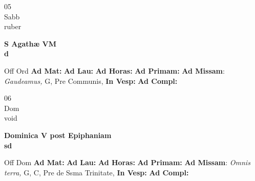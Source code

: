 \documentclass[10pt, openany]{book}
\begin{document}
    \begin{center}
        \begin{minipage}{3.5in}
            \vspace{2em}
            \begin{minipage}{0.5in}
                {\Huge 05} \\
                {\normalsize Sabb} \\
                {\normalsize ruber}
            \end{minipage}
            \begin{minipage}{3.0in}
                \textbf{ \large S Agathæ VM \\
                \textnormal{\normalsize d}} \\ 
            \end{minipage}
            \begin{justify}Off Ord
                \textbf{Ad Mat: }
                \textbf{Ad Lau: }
                \textbf{Ad Horas: }
                \textbf{Ad Primam: }\textbf{Ad Missam}: \textit{Gaudeamus,} G, Pre Communis,  
                \textbf{In Vesp: }
                \textbf{Ad Compl: }
            \end{justify}
        \end{minipage}
    \end{center}

    \begin{center}
        \begin{minipage}{3.5in}
            \vspace{2em}
            \begin{minipage}{0.5in}
                {\Huge 06} \\
                {\normalsize Dom} \\
                {\normalsize void}
            \end{minipage}
            \begin{minipage}{3.0in}
                \textbf{ \large Dominica V post Epiphaniam \\
                \textnormal{\normalsize sd}} \\ 
            \end{minipage}
            \begin{justify}Off Dom
                \textbf{Ad Mat: }
                \textbf{Ad Lau: }
                \textbf{Ad Horas: }
                \textbf{Ad Primam: }\textbf{Ad Missam}: \textit{Omnis terra,} G, C, Pre de Ssma Trinitate,  
                \textbf{In Vesp: }
                \textbf{Ad Compl: }
            \end{justify}
        \end{minipage}
    \end{center}
\end{document}
